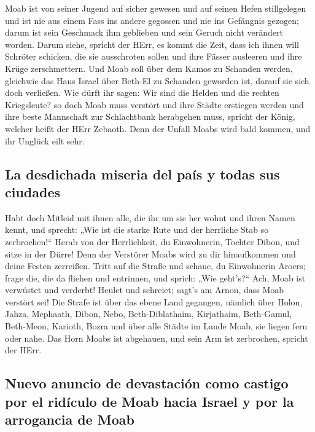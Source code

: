  Moab ist von seiner Jugend auf sicher gewesen und auf
seinen Hefen stillgelegen und ist nie aus einem Fass ins andere gegossen
und nie ins Gefängnis gezogen; darum ist sein Geschmack ihm geblieben
und sein Geruch nicht verändert worden.  Darum siehe,
spricht der HErr, es kommt die Zeit, dass ich ihnen will Schröter
schicken, die sie ausschroten sollen und ihre Fässer ausleeren und ihre
Krüge zerschmettern.  Und Moab soll über dem Kamos zu
Schanden werden, gleichwie das Haus Israel über Beth-El zu Schanden
geworden ist, darauf sie sich doch verließen.  Wie dürft
ihr sagen: Wir sind die Helden und die rechten Kriegsleute?
 so doch Moab muss verstört und ihre Städte erstiegen
werden und ihre beste Mannschaft zur Schlachtbank herabgehen muss,
spricht der König, welcher heißt der HErr Zebaoth.  Denn
der Unfall Moabs wird bald kommen, und ihr Unglück eilt sehr.

\hypertarget{la-desdichada-miseria-del-pauxeds-y-todas-sus-ciudades}{%
\subsection{La desdichada miseria del país y todas sus
ciudades}\label{la-desdichada-miseria-del-pauxeds-y-todas-sus-ciudades}}

 Habt doch Mitleid mit ihnen alle, die ihr um sie her
wohnt und ihren Namen kennt, und sprecht: „Wie ist die starke Rute und
der herrliche Stab so zerbrochen!{}``  Herab von der
Herrlichkeit, du Einwohnerin, Tochter Dibon, und sitze in der Dürre!
Denn der Verstörer Moabs wird zu dir hinaufkommen und deine Festen
zerreißen.  Tritt auf die Straße und schaue, du
Einwohnerin Aroers; frage die, die da fliehen und entrinnen, und sprich:
„Wie geht's?{}``  Ach, Moab ist verwüstet und verderbt!
Heulet und schreiet; sagt's am Arnon, dass Moab verstört sei!
 Die Strafe ist über das ebene Land gegangen, nämlich
über Holon, Jahza, Mephaath,  Dibon, Nebo,
Beth-Diblathaim,  Kirjathaim, Beth-Gamul, Beth-Meon,
 Karioth, Bozra und über alle Städte im Lande Moab, sie
liegen fern oder nahe.  Das Horn Moabs ist abgehauen, und
sein Arm ist zerbrochen, spricht der HErr.

\hypertarget{nuevo-anuncio-de-devastaciuxf3n-como-castigo-por-el-riduxedculo-de-moab-hacia-israel-y-por-la-arrogancia-de-moab}{%
\subsection{Nuevo anuncio de devastación como castigo por el ridículo de
Moab hacia Israel y por la arrogancia de
Moab}\label{nuevo-anuncio-de-devastaciuxf3n-como-castigo-por-el-riduxedculo-de-moab-hacia-israel-y-por-la-arrogancia-de-moab}}

